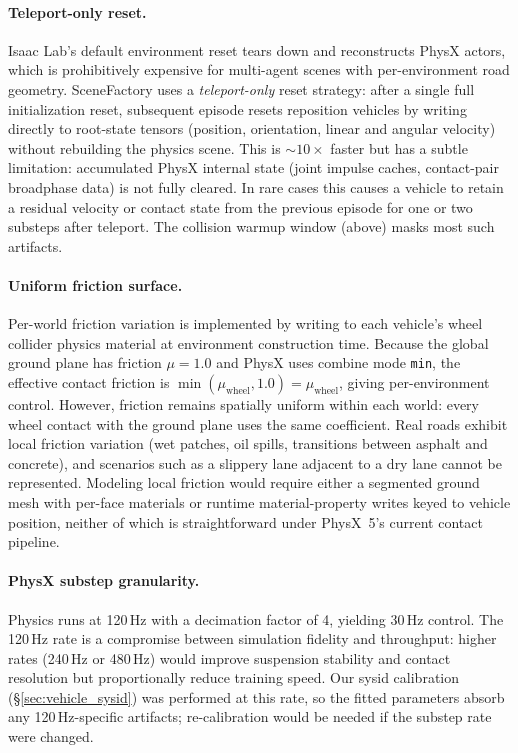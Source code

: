 \paragraph{Teleport-only reset.}
Isaac Lab's default environment reset tears down and reconstructs PhysX actors, which is prohibitively expensive for multi-agent scenes with per-environment road geometry.
SceneFactory uses a \emph{teleport-only} reset strategy: after a single full initialization reset, subsequent episode resets reposition vehicles by writing directly to root-state tensors (position, orientation, linear and angular velocity) without rebuilding the physics scene.
This is ${\sim}10{\times}$ faster but has a subtle limitation: accumulated PhysX internal state (joint impulse caches, contact-pair broadphase data) is not fully cleared.
In rare cases this causes a vehicle to retain a residual velocity or contact state from the previous episode for one or two substeps after teleport.
The collision warmup window (above) masks most such artifacts.

\paragraph{Uniform friction surface.}
Per-world friction variation is implemented by writing to each vehicle's wheel collider physics material at environment construction time.
Because the global ground plane has friction $\mu{=}1.0$ and PhysX uses combine mode \texttt{min}, the effective contact friction is $\min(\mu_{\mathrm{wheel}}, 1.0) = \mu_{\mathrm{wheel}}$, giving per-environment control.
However, friction remains spatially uniform within each world: every wheel contact with the ground plane uses the same coefficient.
Real roads exhibit local friction variation (wet patches, oil spills, transitions between asphalt and concrete), and scenarios such as a slippery lane adjacent to a dry lane cannot be represented.
Modeling local friction would require either a segmented ground mesh with per-face materials or runtime material-property writes keyed to vehicle position, neither of which is straightforward under PhysX~5's current contact pipeline.

\paragraph{PhysX substep granularity.}
Physics runs at 120\,Hz with a decimation factor of 4, yielding 30\,Hz control.
The 120\,Hz rate is a compromise between simulation fidelity and throughput: higher rates (240\,Hz or 480\,Hz) would improve suspension stability and contact resolution but proportionally reduce training speed.
Our sysid calibration (\S\ref{sec:vehicle_sysid}) was performed at this rate, so the fitted parameters absorb any 120\,Hz-specific artifacts; re-calibration would be needed if the substep rate were changed.

